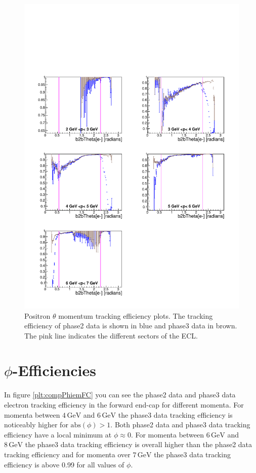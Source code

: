 \documentclass[a4paper,11pt,twosided,final,german,openbib,pdftex,listof=totoc,bibliography=totoc]{scrbook}
\begin{document}
\begin{figure}[!htbp]
	\centering
	\includegraphics[width=\textwidth]{Plots/comp/cMThetaep_Data.pdf}
	\caption[Momentum $\theta$ Positron Efficiency]{Positron $\theta$ momentum tracking efficiency plots. The tracking efficiency of phase2 data is shown in blue and phase3 data in brown. The pink line indicates the different sectors of the ECL.}
	\label{plt:compThetaep}
\end{figure}

\newpage 

\section{$\phi$-Efficiencies}

In figure \ref{plt:compPhiemFC} you can see the phase2 data and phase3 data electron tracking efficiency in the forward end-cap for different momenta. 
For momenta between $4\,\textrm{GeV}$ and $6\,\textrm{GeV}$ the phase3 data tracking efficiency is noticeably higher for $\textrm{abs}(\phi) > 1$. Both phase2 data and phase3 data tracking efficiency have a local minimum at $\phi \approx 0$. 
For momenta between $6\,\textrm{GeV}$ and $8\,\textrm{GeV}$ the phase3 data tracking efficiency is overall higher than the phase2 data tracking efficiency and for momenta over $7\,\textrm{GeV}$ the phase3 data tracking efficiency is above 0.99 for all values of $\phi$.
\end{document}
